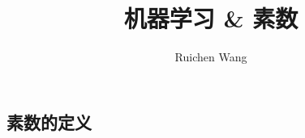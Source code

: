 \documentclass{article}
\author{Ruichen Wang}
\title{机器学习 \& 素数}
\begin{document}
\begin{CJK*}{UTF8}{gbsn}

\maketitle

\section{素数的定义}


\end{CJK*}
\end{document}
